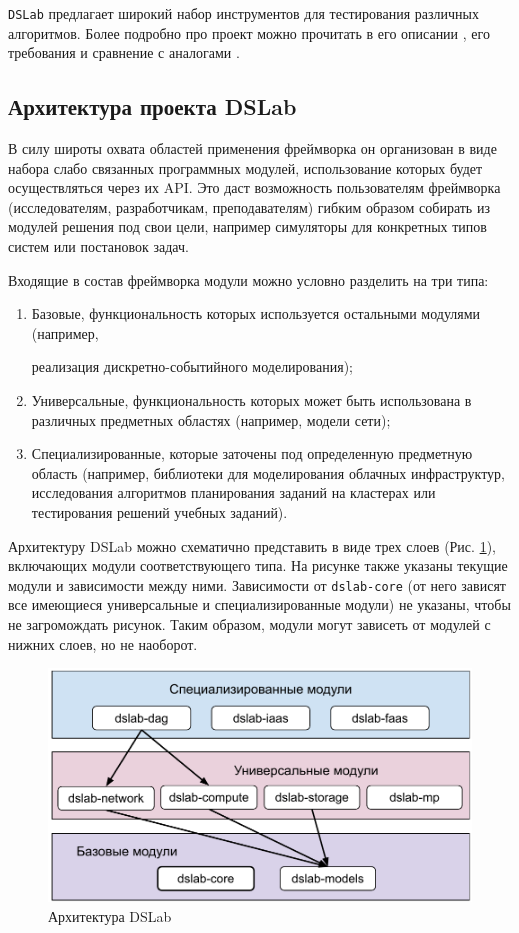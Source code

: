 \texttt{DSLab}\cite{dslab-repo} предлагает широкий набор инструментов для тестирования различных алгоритмов. Более подробно про проект можно прочитать в его описании \cite{dslab-description}, его требования \cite{dslab-requirements} и сравнение с аналогами \cite{dslab-analog-cmp}.

\subsection{Архитектура проекта DSLab}

В силу широты охвата областей применения фреймворка он организован в виде набора слабо связанных программных модулей, использование которых будет осуществляться через их API. Это даст возможность пользователям фреймворка (исследователям, разработчикам, преподавателям) гибким образом собирать из модулей решения под свои цели, например симуляторы для конкретных типов систем или постановок задач.

Входящие в состав фреймворка модули можно условно разделить на три типа:
\begin{enumerate}
    \item 
    Базовые, функциональность которых используется остальными модулями (например, 
    
    реализация дискретно-событийного моделирования);
    \item
    Универсальные, функциональность которых может быть использована в различных предметных областях (например, модели сети);
    \item
    Специализированные, которые заточены под определенную предметную область (например, библиотеки для моделирования облачных инфраструктур, исследования алгоритмов планирования заданий на кластерах или тестирования решений учебных заданий).
\end{enumerate}

Архитектуру DSLab можно схематично представить в виде трех слоев (Рис. \ref{dslab_arc}), включающих модули соответствующего типа. На рисунке также указаны текущие модули и зависимости между ними. Зависимости от \texttt{dslab-core} (от него зависят все имеющиеся универсальные и специализированные модули) не указаны, чтобы не загромождать рисунок. Таким образом, модули могут зависеть от модулей с нижних слоев, но не наоборот.

\begin{figure}[H]
    \centering
    \includegraphics[width=0.7\linewidth]{images/dslab_arc}
    \caption{Архитектура DSLab}
    \label{dslab_arc}
\end{figure}

